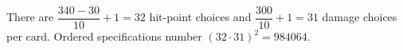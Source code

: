 There are $\dfrac{340-30}{10}+1=32$ hit-point choices and $\dfrac{300}{10}+1=31$ damage choices per card. Ordered specifications number $(32\cdot31)^2=\boxed{984064}$.
